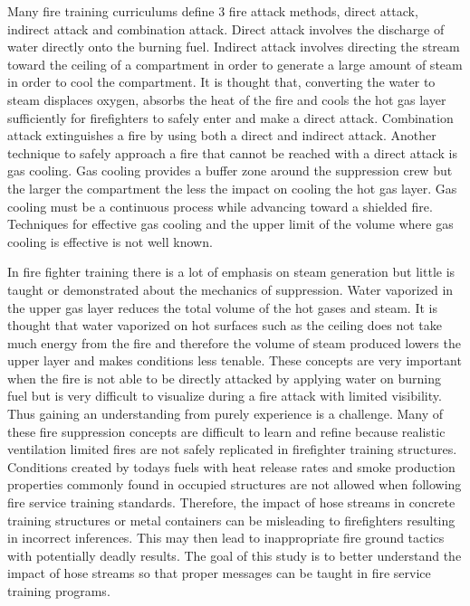 \documentclass[12pt,oneside]{book}
\begin{document}
Many fire training curriculums define 3 fire attack methods, direct attack, indirect attack and combination attack. Direct attack involves the discharge of water directly onto the burning fuel. Indirect attack involves directing the stream toward the ceiling of a compartment in order to generate a large amount of steam in order to cool the compartment. It is thought that, converting the water to steam displaces oxygen, absorbs the heat of the fire and cools the hot gas layer sufficiently for firefighters to safely enter and make a direct attack. Combination attack extinguishes a fire by using both a direct and indirect attack. Another technique to safely approach a fire that cannot be reached with a direct attack is gas cooling. Gas cooling provides a buffer zone around the suppression crew but the larger the compartment the less the impact on cooling the hot gas layer. Gas cooling must be a continuous process while advancing toward a shielded fire. Techniques for effective gas cooling and the upper limit of the volume where gas cooling is effective is not well known.  

In fire fighter training there is a lot of emphasis on steam generation but little is taught or demonstrated about the mechanics of suppression. Water vaporized in the upper gas layer reduces the total volume of the hot gases and steam. It is thought that water vaporized on hot surfaces such as the ceiling does not take much energy from the fire and therefore the volume of steam produced lowers the upper layer and makes conditions less tenable. These concepts are very important when the fire is not able to be directly attacked by applying water on burning fuel but is very difficult to visualize during a fire attack with limited visibility. Thus gaining an understanding from purely experience is a challenge. Many of these fire suppression concepts are difficult to learn and refine because realistic ventilation limited fires are not safely replicated in firefighter training structures. Conditions created by todays fuels with heat release rates and smoke production properties commonly found in occupied structures are not allowed when following fire service training standards. Therefore, the impact of hose streams in concrete training structures or metal containers can be misleading to firefighters resulting in incorrect inferences. This may then lead to inappropriate fire ground tactics with potentially deadly results. The goal of this study is to better understand the impact of hose streams so that proper messages can be taught in fire service training programs.  
\end{document}
